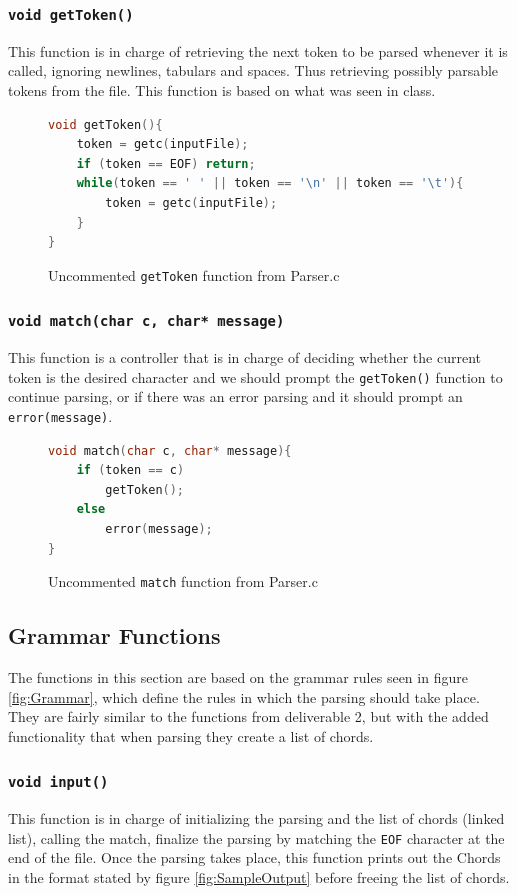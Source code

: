 \documentclass{article}
\begin{document}
\subsubsection{\texttt{void getToken()}}
This function is in charge of retrieving the next token to be parsed whenever it is called, ignoring newlines, tabulars and spaces. Thus retrieving possibly parsable tokens from the file. This function is based on what was seen in class.
\begin{figure}[H]
    \begin{lstlisting}[language=C]
void getToken(){
    token = getc(inputFile);
    if (token == EOF) return; 
    while(token == ' ' || token == '\n' || token == '\t'){
        token = getc(inputFile);
    }
}
    \end{lstlisting}
    \caption{Uncommented \texttt{getToken} function from Parser.c}
\end{figure}
\subsubsection{\texttt{void match(char c, char* message)}} 
This function is a controller that is in charge of deciding whether the current token is the desired character and we should prompt the \texttt{getToken()} function to continue parsing, or if there was an error parsing and it should prompt an \texttt{error(message)}.
\begin{figure}[H]
    \begin{lstlisting}[language=C]
void match(char c, char* message){
    if (token == c) 
        getToken();
    else 
        error(message);
}
    \end{lstlisting}
    \caption{Uncommented \texttt{match} function from Parser.c}
\end{figure}
\subsection{Grammar Functions}
The functions in this section are based on the grammar rules seen in figure \ref{fig:Grammar}, which define the rules in which the parsing should take place. They are fairly similar to the functions from deliverable 2, but with the added functionality that when parsing they create a list of chords.
\subsubsection{\texttt{void input()}}
This function is in charge of initializing the parsing and the list of chords (linked list), calling the match, finalize the parsing by matching the \texttt{EOF} character at the end of the file. Once the parsing takes place, this function prints out the Chords in the format stated by figure \ref{fig:SampleOutput} before freeing the list of chords.
\end{document}

